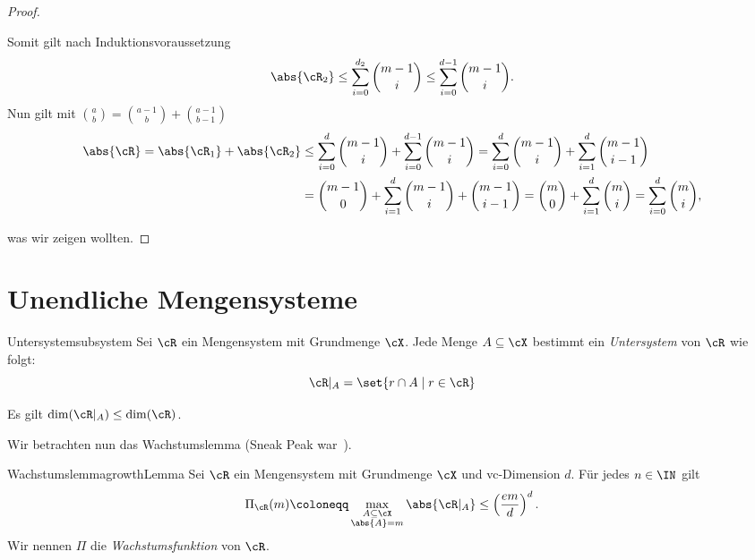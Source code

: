 \documentclass[language=ngerman,algolist,acrolist]{TemplateLecture}
\begin{document}
\begin{proof}
\begin{description}
        Somit gilt nach Induktionsvoraussetzung
        \begin{equation*}
            \abs{\cR_2} \leq \sum_{i = 0}^{d_2} \binom{m-1}{i} \leq \sum_{i = 0}^{d-1} \binom{m-1}{i}.
        \end{equation*}
        Nun gilt mit $\binom{a}{b} = \binom{a-1}{b} + \binom{a-1}{b-1}$
        \begin{equation*}
            \begin{split}
                \abs{\cR} = \abs{\cR_1} + \abs{\cR_2} &\leq \sum_{i = 0}^d \binom{m-1}{i} + \sum_{i = 0}^{d-1} \binom{m-1}{i} = \sum_{i = 0}^d \binom{m-1}{i}+ \sum_{i = 1}^d \binom{m-1}{i-1} \\
                &= \binom{m-1}{0} + \sum_{i = 1}^d \binom{m-1}{i} + \binom{m-1}{i-1} = \binom{m}{0} + \sum_{i = 1}^d \binom{m}{i} = \sum_{i = 0}^d \binom{m}{i},
            \end{split}
        \end{equation*}
    \end{description}
    was wir zeigen wollten.
\end{proof}

\section{Unendliche Mengensysteme}
\begin{defi}{Untersystem}{subsystem}
    Sei $\cR$ ein Mengensystem mit Grundmenge $\cX$. Jede Menge $A \subseteq \cX$ bestimmt ein \emph{Untersystem} von $\cR$ wie folgt:
    \begin{equation*}
        \cR|_A = \set{r \cap A \mid r \in \cR}
    \end{equation*}
\end{defi}
Es gilt $\dim(\cR|_A) \leq \dim(\cR)$.


Wir betrachten nun das Wachstumslemma (Sneak Peak war~).

\begin{lem}{Wachstumslemma}{growthLemma}
    Sei $\cR$ ein Mengensystem mit Grundmenge $\cX$ und \ac{vc}-Dimension $d$. Für jedes $n \in \IN$ gilt 
    \begin{equation*}
        \Pi_\cR(m) \coloneqq \max_{\substack{A \subseteq \cX \\ \abs{A} = m}} \abs{\cR|_A} \leq \left( \frac{em}{d} \right)^d.
    \end{equation*}
    Wir nennen $\Pi$ die \emph{Wachstumsfunktion} von $\cR$.
\end{lem}
\end{document}
